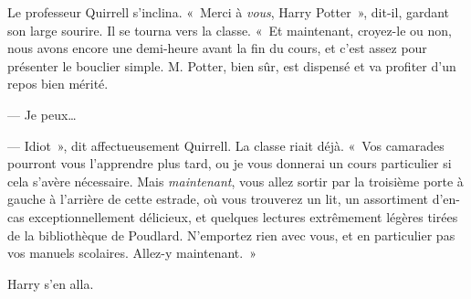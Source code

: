 Le professeur Quirrell s'inclina.
«~Merci à \emph{vous}, Harry Potter~», dit-il, gardant son large sourire.
Il se tourna vers la classe.
«~Et maintenant, croyez-le ou non, nous avons encore une demi-heure avant la fin du cours, et c'est assez pour présenter le bouclier simple.
M. Potter, bien sûr, est dispensé et va profiter d'un repos bien mérité.

--- Je peux…

--- Idiot~», dit affectueusement Quirrell.
La classe riait déjà.
«~Vos camarades pourront vous l'apprendre plus tard, ou je vous donnerai un cours particulier si cela s'avère nécessaire.
Mais \emph{maintenant}, vous allez sortir par la troisième porte à gauche à l'arrière de cette estrade, où vous trouverez un lit, un assortiment d'en-cas exceptionnellement délicieux, et quelques lectures extrêmement légères tirées de la bibliothèque de Poudlard.
N'emportez rien avec vous, et en particulier pas vos manuels scolaires.
Allez-y maintenant.~»

Harry s'en alla.
